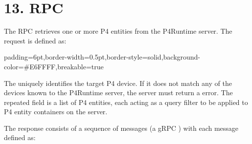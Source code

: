 \documentclass[11pt]{article}
\begin{document}
{%
\section{13.\hspace*{0.5em} RPC}\label{sec-read-rpc}%

\noindent{}The  RPC retrieves one or more P4 entities from the P4Runtime server. The
request is defined as:%

\begin{mdbmargintb}{6pt}{6pt}%
\begin{mdblock}{padding=6pt,border-width=0.5pt,border-style=solid,background-color=\#E6FFFF,breakable=true}%
\begin{mdpre}%
\end{mdpre}%
\end{mdblock}%
\end{mdbmargintb}%

\noindent{}The  uniquely identifies the target P4 device. If it does not match
any of the devices known to the P4Runtime server, the server must return a
 error. The  repeated field is a list of P4 entities, each
acting as a query filter to be applied to P4 entity containers on the server.%

The response consists of a sequence of messages (a gRPC ) with
each message defined as:%

}
\end{document}

